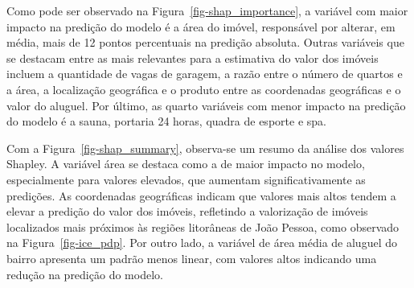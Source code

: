 \documentclass[
  12pt,
  a4paper,
]{scrreprt}
\begin{document}
\vspace{12pt}

Como pode ser observado na Figura~\ref{fig-shap_importance}, a variável
com maior impacto na predição do modelo é a área do imóvel, responsável
por alterar, em média, mais de 12 pontos percentuais na predição
absoluta. Outras variáveis que se destacam entre as mais relevantes para
a estimativa do valor dos imóveis incluem a quantidade de vagas de
garagem, a razão entre o número de quartos e a área, a localização
geográfica e o produto entre as coordenadas geográficas e o valor do
aluguel. Por último, as quarto variáveis com menor impacto na predição
do modelo é a sauna, portaria 24 horas, quadra de esporte e spa.

\vspace{12pt}

Com a Figura~\ref{fig-shap_summary}, observa-se um resumo da análise dos
valores Shapley. A variável área se destaca como a de maior impacto no
modelo, especialmente para valores elevados, que aumentam
significativamente as predições. As coordenadas geográficas indicam que
valores mais altos tendem a elevar a predição do valor dos imóveis,
refletindo a valorização de imóveis localizados mais próximos às regiões
litorâneas de João Pessoa, como observado na Figura~\ref{fig-ice_pdp}.
Por outro lado, a variável de área média de aluguel do bairro apresenta
um padrão menos linear, com valores altos indicando uma redução na
predição do modelo.
\end{document}
